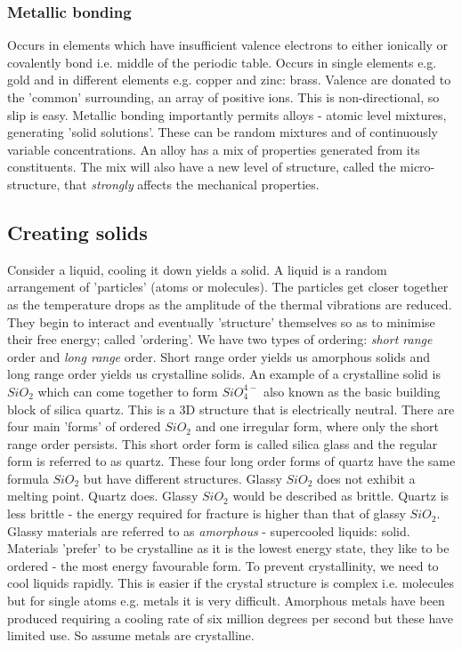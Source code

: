 \documentclass[class=report, crop=false, 12pt,a4paper]{standalone}
\begin{document}
\subsubsection{Metallic bonding}
Occurs in elements which have insufficient valence electrons to either ionically or covalently bond i.e. middle of the periodic table. Occurs in single elements e.g. gold and in different elements e.g. copper and zinc: brass. Valence are donated to the 'common' surrounding, an array of positive ions. This is non-directional, so slip is easy. Metallic bonding importantly permits alloys - atomic level mixtures, generating 'solid solutions'. These can be random mixtures and of continuously variable concentrations. An alloy has a mix of properties generated from its constituents. The mix will also have a new level of structure, called the micro-structure, that \emph{strongly} affects the mechanical properties. 
\subsection{Creating solids}
Consider a liquid, cooling it down yields a solid. A liquid is a random arrangement of 'particles' (atoms or molecules). The particles get closer together as the temperature drops as the amplitude of the thermal vibrations are reduced. They begin to interact and eventually 'structure' themselves so as to minimise their free energy; called 'ordering'. We have two types of ordering: \emph{short range} order and \emph{long range} order. Short range order yields us amorphous solids and long range order yields us crystalline solids. An example of a crystalline solid is \(SiO_2\) which can come together to form \(SiO_4^{4-}\) also known as the basic building block of silica quartz. This is a 3D structure that is electrically neutral. There are four main 'forms' of ordered \(SiO_2\) and one irregular form, where only the short range order persists. This short order form is called silica glass and the regular form is referred to as quartz. These four long order forms of quartz have the same formula \(SiO_2\) but have different structures. Glassy \(SiO_2\) does not exhibit a melting point. Quartz does. Glassy \(SiO_2\) would be described as brittle. Quartz is less brittle - the energy required for fracture is higher than that of glassy \(SiO_2\). Glassy materials are referred to as \emph{amorphous} - supercooled liquids: solid. Materials 'prefer' to be crystalline as it is the lowest energy state, they like to be ordered - the most energy favourable form. To prevent crystallinity, we need to cool liquids rapidly. This is easier if the crystal structure is complex i.e. molecules but for single atoms e.g. metals it is very difficult. Amorphous metals have been produced requiring a cooling rate of six million degrees per second but these have limited use. So assume metals are crystalline.  
\end{document}
